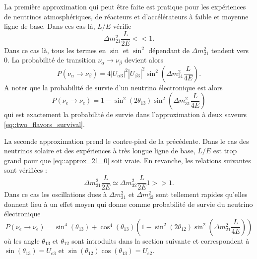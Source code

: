             La première approximation qui peut être faite est pratique pour les expériences de neutrinos atmosphériques, de réacteurs et d'accélérateurs à faible et moyenne ligne de base. Dans ces cas là, $L/E$ vérifie
            \begin{equation}\label{eq::approx_21_0}
                \Delta m^2_{21}\frac{L}{2E} << 1.
            \end{equation}
            Dans ce cas là, tous les termes en $\sin$ et $\sin^2$ dépendant de $\Delta m^2_{21}$ tendent vers 0. La probabilité de transition $\nu_{\alpha}\to\nu_{\beta}$ devient alors
            \begin{equation}
                P(\nu_{\alpha}\to\nu_{\beta}) = 4|U_{\alpha 3}|^2|U_{\beta 3}|^2\sin^2\left(\Delta m^2_{31}\frac{L}{4E}\right).
            \end{equation}
            A noter que la probabilité de survie d'un neutrino électronique est alors
            \begin{equation}\label{eq::e_survival_reactor}
                P(\nu_e\to\nu_e) = 1-\sin^2(2\theta_{13})\sin^2\left(\Delta m^2_{31}\frac{L}{4E}\right)
            \end{equation}
            qui est exactement la probabilité de survie dans l'approximation à deux saveurs \eqref{eq::two_flavors_survival}.
            
            La seconde approximation prend le contre-pied de la précédente. Dans le cas des neutrinos solaire et des expériences à très longue ligne de base, $L/E$ est trop grand pour que \eqref{eq::approx_21_0} soit vraie. En revanche, les relations suivantes sont vérifiées : 
            \begin{equation}\label{eq::approx_31_eq_32}
                \Delta m^2_{31}\frac{L}{2E} \simeq \Delta m^2_{32}\frac{L}{2E} 1 >> 1.
            \end{equation}
            Dans ce cas les oscillations dues à $\Delta m^2_{31}$ et $\Delta m^2_{32}$ sont tellement rapides qu'elles donnent lieu à un effet moyen qui donne comme probabilité de survie du neutrino électronique
            \begin{equation}
                P(\nu_e\to\nu_e) = \sin^4(\theta_{13}) + \cos^4(\theta_{13})\left(1-\sin^2(2\theta_{12})\sin^2\left(\Delta m^2_{21}\frac{L}{4E}\right)\right)
            \end{equation}
            où les angle $\theta_{13}$ et $\theta_{12}$ sont introduits dans la section suivante et correspondent à $\sin(\theta_{13})=U_{e3}$ et $\sin(\theta_{12})\cos(\theta_{13})=U_{e2}$.
            
